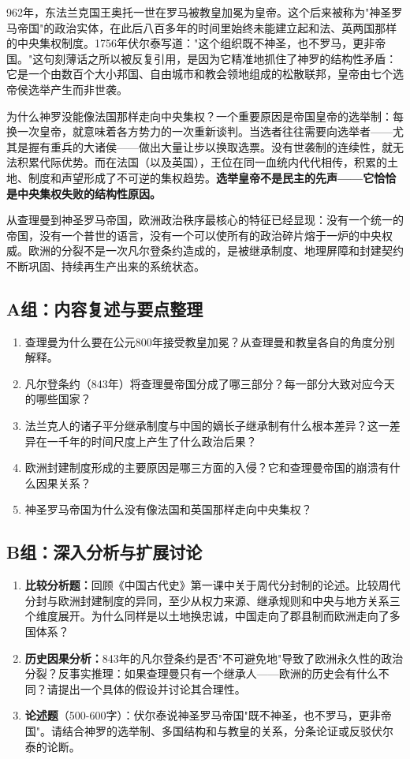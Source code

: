 \documentclass[a4paper,12pt]{ctexart}
\begin{document}
962年，东法兰克国王奥托一世在罗马被教皇加冕为皇帝。这个后来被称为"神圣罗马帝国"的政治实体，在此后八百多年的时间里始终未能建立起和法、英两国那样的中央集权制度。1756年伏尔泰写道："这个组织既不神圣，也不罗马，更非帝国。"这句刻薄话之所以被反复引用，是因为它精准地抓住了神罗的结构性矛盾：它是一个由数百个大小邦国、自由城市和教会领地组成的松散联邦，皇帝由七个选帝侯选举产生而非世袭。

为什么神罗没能像法国那样走向中央集权？一个重要原因是帝国皇帝的选举制：每换一次皇帝，就意味着各方势力的一次重新谈判。当选者往往需要向选举者——尤其是握有重兵的大诸侯——做出大量让步以换取选票。没有世袭制的连续性，就无法积累代际优势。而在法国（以及英国），王位在同一血统内代代相传，积累的土地、制度和声望形成了不可逆的集权趋势。\textbf{选举皇帝不是民主的先声——它恰恰是中央集权失败的结构性原因。}

从查理曼到神圣罗马帝国，欧洲政治秩序最核心的特征已经显现：没有一个统一的帝国，没有一个普世的语言，没有一个可以使所有的政治碎片熔于一炉的中央权威。欧洲的分裂不是一次凡尔登条约造成的，是被继承制度、地理屏障和封建契约不断巩固、持续再生产出来的系统状态。

\subsection*{A组：内容复述与要点整理}

\begin{enumerate}[label=A\arabic*.]
  \item 查理曼为什么要在公元800年接受教皇加冕？从查理曼和教皇各自的角度分别解释。
  \item 凡尔登条约（843年）将查理曼帝国分成了哪三部分？每一部分大致对应今天的哪些国家？
  \item 法兰克人的诸子平分继承制度与中国的嫡长子继承制有什么根本差异？这一差异在一千年的时间尺度上产生了什么政治后果？
  \item 欧洲封建制度形成的主要原因是哪三方面的入侵？它和查理曼帝国的崩溃有什么因果关系？
  \item 神圣罗马帝国为什么没有像法国和英国那样走向中央集权？
\end{enumerate}

\subsection*{B组：深入分析与扩展讨论}

\begin{enumerate}[label=B\arabic*.]
  \item \textbf{比较分析题：}回顾《中国古代史》第一课中关于周代分封制的论述。比较周代分封与欧洲封建制度的异同，至少从权力来源、继承规则和中央与地方关系三个维度展开。为什么同样是以土地换忠诚，中国走向了郡县制而欧洲走向了多国体系？
  \item \textbf{历史因果分析：}843年的凡尔登条约是否"不可避免地"导致了欧洲永久性的政治分裂？反事实推理：如果查理曼只有一个继承人——欧洲的历史会有什么不同？请提出一个具体的假设并讨论其合理性。
  \item \textbf{论述题}（500-600字）：伏尔泰说神圣罗马帝国"既不神圣，也不罗马，更非帝国"。请结合神罗的选举制、多国结构和与教皇的关系，分条论证或反驳伏尔泰的论断。
\end{enumerate}
\end{document}
